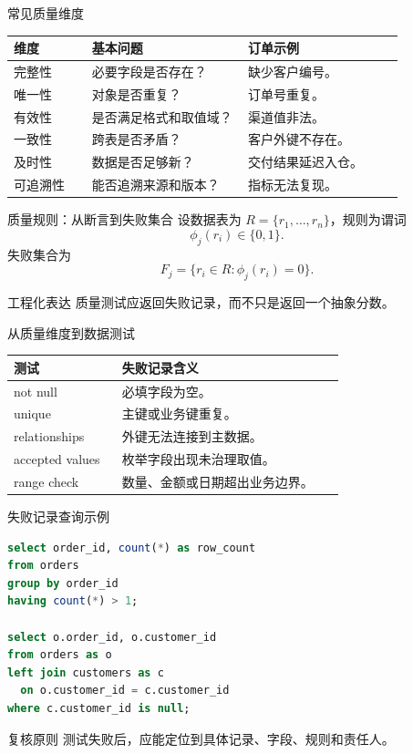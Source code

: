 \documentclass[UTF8,fontset=fandol,aspectratio=169,11pt]{ctexbeamer}
\begin{document}
\begin{frame}{常见质量维度}
\begin{table}
\small
\centering
\begin{tabular}{p{0.17\linewidth}p{0.34\linewidth}p{0.34\linewidth}}
\toprule
维度 & 基本问题 & 订单示例\\
\midrule
完整性 & 必要字段是否存在？ & 缺少客户编号。\\
唯一性 & 对象是否重复？ & 订单号重复。\\
有效性 & 是否满足格式和取值域？ & 渠道值非法。\\
一致性 & 跨表是否矛盾？ & 客户外键不存在。\\
及时性 & 数据是否足够新？ & 交付结果延迟入仓。\\
可追溯性 & 能否追溯来源和版本？ & 指标无法复现。\\
\bottomrule
\end{tabular}
\end{table}
\end{frame}

\begin{frame}{质量规则：从断言到失败集合}
设数据表为 \(R=\{r_1,\ldots,r_n\}\)，规则为谓词
\[
\phi_j(r_i)\in\{0,1\}.
\]
失败集合为
\[
F_j=\{r_i\in R:\phi_j(r_i)=0\}.
\]

\begin{block}{工程化表达}
质量测试应返回失败记录，而不只是返回一个抽象分数。
\end{block}
\end{frame}

\begin{frame}{从质量维度到数据测试}
\begin{table}
\small
\centering
\begin{tabular}{p{0.22\linewidth}p{0.50\linewidth}}
\toprule
测试 & 失败记录含义\\
\midrule
not null & 必填字段为空。\\
unique & 主键或业务键重复。\\
relationships & 外键无法连接到主数据。\\
accepted values & 枚举字段出现未治理取值。\\
range check & 数量、金额或日期超出业务边界。\\
\bottomrule
\end{tabular}
\end{table}
\end{frame}

\begin{frame}[fragile]{失败记录查询示例}
\begin{lstlisting}[language=SQL]
select order_id, count(*) as row_count
from orders
group by order_id
having count(*) > 1;

select o.order_id, o.customer_id
from orders as o
left join customers as c
  on o.customer_id = c.customer_id
where c.customer_id is null;
\end{lstlisting}

\begin{alertblock}{复核原则}
测试失败后，应能定位到具体记录、字段、规则和责任人。
\end{alertblock}
\end{frame}
\end{document}
